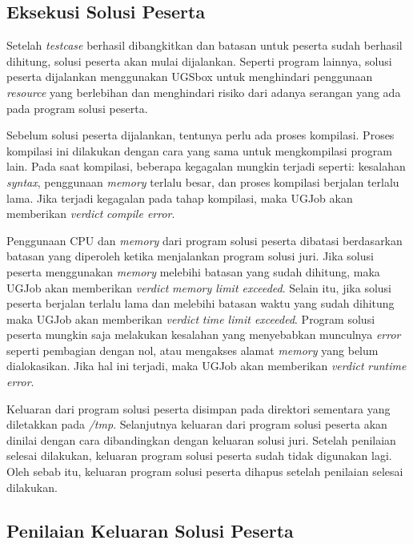 \subsection{Eksekusi Solusi Peserta}

\par Setelah \textit{testcase} berhasil dibangkitkan dan batasan untuk peserta sudah berhasil dihitung, solusi peserta akan mulai dijalankan. Seperti program lainnya, solusi peserta dijalankan menggunakan UGSbox untuk menghindari penggunaan \textit{resource} yang berlebihan dan menghindari risiko dari adanya serangan yang ada pada program solusi peserta.

\par Sebelum solusi peserta dijalankan, tentunya perlu ada proses kompilasi. Proses kompilasi ini dilakukan dengan cara yang sama untuk mengkompilasi program lain. Pada saat kompilasi, beberapa kegagalan mungkin terjadi seperti: kesalahan \textit{syntax}, penggunaan \textit{memory} terlalu besar, dan proses kompilasi berjalan terlalu lama. Jika terjadi kegagalan pada tahap kompilasi, maka UGJob akan memberikan \textit{verdict} \textit{compile error}.

\par Penggunaan CPU dan \textit{memory} dari program solusi peserta dibatasi berdasarkan batasan yang diperoleh ketika menjalankan program solusi juri. Jika solusi peserta menggunakan \textit{memory} melebihi batasan yang sudah dihitung, maka UGJob akan memberikan \textit{verdict} \textit{memory limit exceeded}. Selain itu, jika solusi peserta berjalan terlalu lama dan melebihi batasan waktu yang sudah dihitung maka UGJob akan memberikan \textit{verdict} \textit{time limit exceeded}. Program solusi peserta mungkin saja melakukan kesalahan yang menyebabkan munculnya \textit{error} seperti pembagian dengan nol, atau mengakses alamat \textit{memory} yang belum dialokasikan. Jika hal ini terjadi, maka UGJob akan memberikan \textit{verdict} \textit{runtime error}.

\par Keluaran dari program solusi peserta disimpan pada direktori sementara yang diletakkan pada \textit{/tmp}. Selanjutnya keluaran dari program solusi peserta akan dinilai dengan cara dibandingkan dengan keluaran solusi juri. Setelah penilaian selesai dilakukan, keluaran program solusi peserta sudah tidak digunakan lagi. Oleh sebab itu, keluaran program solusi peserta dihapus setelah penilaian selesai dilakukan.

\subsection{Penilaian Keluaran Solusi Peserta}

